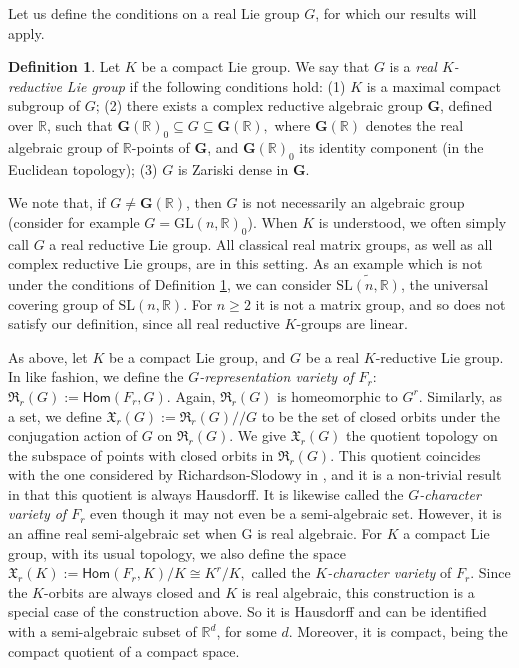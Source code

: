 \documentclass[a4paper,11pt,twoside]{article}
\newcounter{a}
\numberwithin{equation}{section}
\numberwithin{figure}{section}
\theoremstyle{plain}
\theoremstyle{definition}
\newtheorem{defn}[thm]{Definition}
\theoremstyle{remark}
\theoremstyle{plain}
\theoremstyle{plain}
\theoremstyle{plain}
\begin{document}
Let us define the conditions on a real Lie group $G$, for which
our results will apply.
\begin{defn}
\label{def:condforG} Let $K$ be a compact
Lie group. We say that $G$ is a {\em real $K$-reductive Lie group} if the following conditions hold:
(1) $K$ is a maximal compact subgroup of $G$;
(2) there exists a complex reductive algebraic group $\mathbf{G}$, defined over ${\mathbb{R}}$, such that
$\mathbf{G}({\mathbb{R}})_{0}\subseteq G\subseteq\mathbf{G}({\mathbb{R}}),$
 where $\mathbf{G}({\mathbb{R}})$ denotes the real algebraic group of ${\mathbb{R}}$-points
of $\mathbf{G}$, and $\mathbf{G}({\mathbb{R}})_{0}$ its identity component (in the Euclidean topology);
(3) $G$ is Zariski dense in $\mathbf{G}$.
\end{defn}

We note that, if $G\neq\mathbf{G}({\mathbb{R}})$, then $G$ is not
necessarily an algebraic group (consider for example $G={\mathrm{GL}}(n,{\mathbb{R}})_{0}$).
When $K$ is understood, we often simply call $G$ a real reductive Lie group.
All classical real matrix groups, as well as all complex reductive Lie groups,
are in this setting. As an example which is
not under the conditions of Definition \ref{def:condforG}, we can
consider $\widetilde{{\mathrm{SL}}(n,{\mathbb{R}})}$, the universal covering group of
${\mathrm{SL}}(n,{\mathbb{R}})$. For $n{\geqslant} 2$ it is not a matrix group, and so does not satisfy our definition, since all real reductive $K$-groups are linear.

As above, let $K$ be a compact Lie group, and $G$ be a real $K$-reductive Lie group.
In like fashion, we define the \emph{$G$-representation variety of $F_{r}$}:
$
\mathfrak{R}_{r}(G):={\mathsf{Hom}}(F_{r},G).
$
Again, $\mathfrak{R}_{r}(G)$ is homeomorphic to $G^{r}$.
Similarly, as a set, we define
$\mathfrak{X}_{r}(G):=\mathfrak{R}_{r}(G)/\!/G
$
to be the set of closed orbits under the conjugation action of $G$
on $\mathfrak{R}_{r}(G)$. We give $\mathfrak{X}_{r}(G)$ the quotient topology on the subspace of points with closed orbits in $\mathfrak{R}_{r}(G)$.   This quotient coincides with the one considered by Richardson-Slodowy in \cite[Section 7]{rich-slod:1990}, and it is a non-trivial result in \cite{rich-slod:1990} that this quotient is always Hausdorff.  It is likewise called the \emph{$G$-character variety of $F_r$} even though it may not even be a semi-algebraic set.  However, it is an affine real semi-algebraic set when G is real algebraic.
For $K$ a compact Lie group, with its usual topology, we also define the space $\mathfrak{X}_{r}(K):={\mathsf{Hom}}(F_{r},K)/K\cong K^{r}/K,$ called the \emph{$K$-character variety} of $F_{r}$.  Since the $K$-orbits are always closed and $K$ is real algebraic, this construction is a special case of the construction above.  So it is Hausdorff and  can be identified with a semi-algebraic subset of $\mathbb{R}^{d}$, for some $d$. Moreover, it is compact, being the compact quotient of a compact space.
\end{document}
